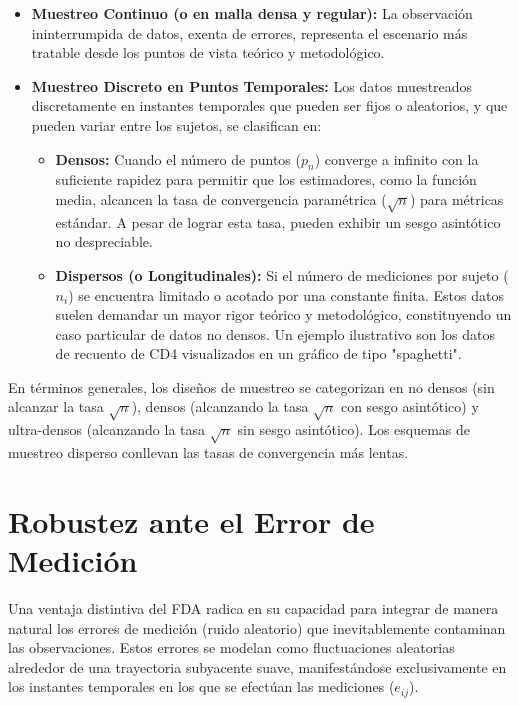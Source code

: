 \documentclass{article}
\begin{document}
\begin{itemize}[label=$\bullet$]
    \item \textbf{Muestreo Continuo (o en malla densa y regular):} La observación ininterrumpida de datos, exenta de errores, representa el escenario más tratable desde los puntos de vista teórico y metodológico.
    \item \textbf{Muestreo Discreto en Puntos Temporales:} Los datos muestreados discretamente en instantes temporales que pueden ser fijos o aleatorios, y que pueden variar entre los sujetos, se clasifican en:
    \begin{itemize}[label=$\circ$]
        \item \textbf{Densos:} Cuando el número de puntos ($p_n$) converge a infinito con la suficiente rapidez para permitir que los estimadores, como la función media, alcancen la tasa de convergencia paramétrica ($\sqrt{n}$) para métricas estándar. A pesar de lograr esta tasa, pueden exhibir un sesgo asintótico no despreciable.
        \item \textbf{Dispersos (o Longitudinales):} Si el número de mediciones por sujeto ($n_i$) se encuentra limitado o acotado por una constante finita. Estos datos suelen demandar un mayor rigor teórico y metodológico, constituyendo un caso particular de datos no densos. Un ejemplo ilustrativo son los datos de recuento de CD4 visualizados en un gráfico de tipo "spaghetti".
    \end{itemize}
\end{itemize}

En términos generales, los diseños de muestreo se categorizan en no densos (sin alcanzar la tasa $\sqrt{n}$), densos (alcanzando la tasa $\sqrt{n}$ con sesgo asintótico) y ultra-densos (alcanzando la tasa $\sqrt{n}$ sin sesgo asintótico). Los esquemas de muestreo disperso conllevan las tasas de convergencia más lentas.

\section*{\large Robustez ante el Error de Medición}
Una ventaja distintiva del FDA radica en su capacidad para integrar de manera natural los errores de medición (ruido aleatorio) que inevitablemente contaminan las observaciones. Estos errores se modelan como fluctuaciones aleatorias alrededor de una trayectoria subyacente suave, manifestándose exclusivamente en los instantes temporales en los que se efectúan las mediciones ($e_{ij}$).
\end{document}
